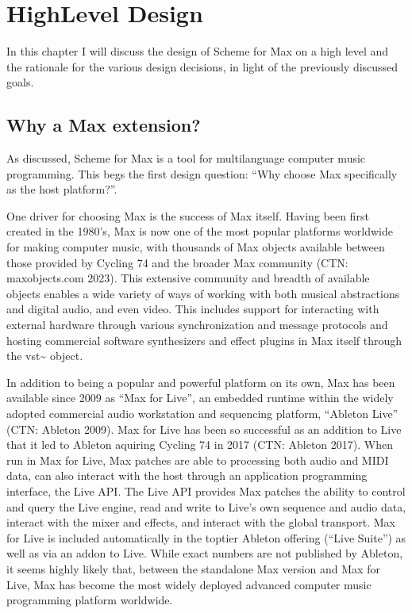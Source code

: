 \documentclass[letterpaper,10pt,english]{sphinxmanual}
\begin{document}
\chapter{High\sphinxhyphen{}Level Design}
\label{\detokenize{design:high-level-design}}\label{\detokenize{design::doc}}
\sphinxAtStartPar
In this chapter I will discuss the design of Scheme for Max on a high level
and the rationale for the various design decisions, in light of the previously discussed goals.


\section{Why a Max extension?}
\label{\detokenize{design:why-a-max-extension}}
\sphinxAtStartPar
As discussed, Scheme for Max is a tool for multi\sphinxhyphen{}language computer music programming. This begs
the first design question: “Why choose Max specifically as the host platform?”.

\sphinxAtStartPar
One driver for choosing Max is the success of Max itself.
Having been first created in the 1980’s, Max is now one of the most popular platforms world\sphinxhyphen{}wide
for making computer music, with thousands of Max objects available between those provided by Cycling 74 and
the broader Max community (CTN: maxobjects.com 2023).
This extensive community and breadth of available objects enables a wide variety of ways of working
with both musical abstractions and digital audio, and even video.
This includes support for interacting with external hardware through various synchronization and
message protocols and hosting commercial software synthesizers and effect plugins in Max itself through
the vst\textasciitilde{} object.

\sphinxAtStartPar
In addition to being a popular and powerful platform on its own, Max has been available since 2009 as “Max for Live”,
an embedded runtime within the widely adopted commercial audio workstation and sequencing platform, “Ableton Live”
(CTN: Ableton 2009).
Max for Live has been so successful as an addition to Live that it led to Ableton aquiring Cycling 74 in 2017
(CTN: Ableton 2017).
When run in Max for Live, Max patches are able to processing both audio
and MIDI data, can also interact with the host through an application programming interface, the Live API.
The Live API provides Max patches the ability to control and query the Live engine, read and write to
Live’s own sequence and audio data, interact with the mixer and effects, and interact with the global transport.
Max for Live is included automatically in the top\sphinxhyphen{}tier Ableton offering (“Live Suite”) as well as via an add\sphinxhyphen{}on to Live.
While exact numbers are not published by Ableton, it seems highly likely that, between the standalone Max
version and Max for Live, Max has become the most widely deployed advanced computer music programming platform worldwide.
\end{document}
